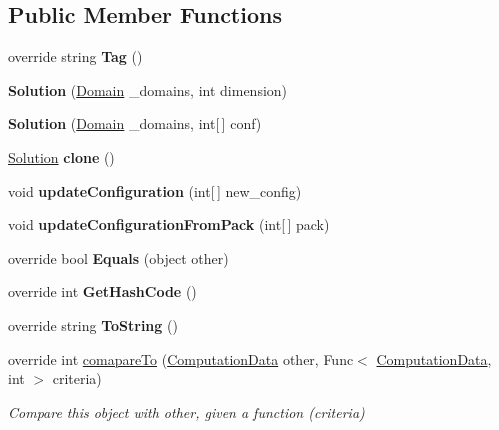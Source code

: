 \subsection*{Public Member Functions}
\begin{DoxyCompactItemize}
\item 
\mbox{\label{classPOSL_1_1Data_1_1Solution_a6f8f2ff8819270093192eef264fcb94a}} 
override string {\bfseries Tag} ()
\item 
\mbox{\label{classPOSL_1_1Data_1_1Solution_a2a512552c56c237d0e763a42dd79023b}} 
{\bfseries Solution} (\hyperlink{classPOSL_1_1Domain}{Domain} \+\_\+domains, int dimension)
\item 
\mbox{\label{classPOSL_1_1Data_1_1Solution_ad41835bbe166b5a4d2f7e86ac225a488}} 
{\bfseries Solution} (\hyperlink{classPOSL_1_1Domain}{Domain} \+\_\+domains, int\mbox{[}$\,$\mbox{]} conf)
\item 
\mbox{\label{classPOSL_1_1Data_1_1Solution_aafe2ae78ea574fd6441d66bc53d4f38f}} 
\hyperlink{classPOSL_1_1Data_1_1Solution}{Solution} {\bfseries clone} ()
\item 
\mbox{\label{classPOSL_1_1Data_1_1Solution_ae68f001d568db1822a965ccb8a8c6589}} 
void {\bfseries update\+Configuration} (int\mbox{[}$\,$\mbox{]} new\+\_\+config)
\item 
\mbox{\label{classPOSL_1_1Data_1_1Solution_a10b51da92bbd9f24143dc89d1dbdb942}} 
void {\bfseries update\+Configuration\+From\+Pack} (int\mbox{[}$\,$\mbox{]} pack)
\item 
\mbox{\label{classPOSL_1_1Data_1_1Solution_ad9de751fef1cd07ee4030f785b4d6c6f}} 
override bool {\bfseries Equals} (object other)
\item 
\mbox{\label{classPOSL_1_1Data_1_1Solution_a7d4ed9105296d47444202d6deb4a3686}} 
override int {\bfseries Get\+Hash\+Code} ()
\item 
\mbox{\label{classPOSL_1_1Data_1_1Solution_a5ef760701c868dcdf65545fefeda89c7}} 
override string {\bfseries To\+String} ()
\item 
override int \hyperlink{classPOSL_1_1Data_1_1Solution_a17d810433104964cc43bf65f35d25cc7}{comapare\+To} (\hyperlink{classPOSL_1_1Data_1_1ComputationData}{Computation\+Data} other, Func$<$ \hyperlink{classPOSL_1_1Data_1_1ComputationData}{Computation\+Data}, int $>$ criteria)
\begin{DoxyCompactList}\small\item\em Compare this object with other, given a function (criteria) \end{DoxyCompactList}\end{DoxyCompactItemize}
